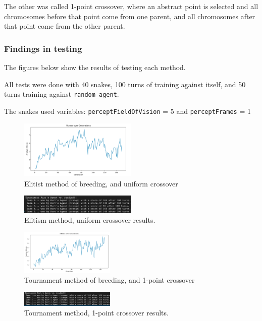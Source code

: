 \documentclass[12pt]{article}
\begin{document}
The other was called 1-point crossover, where an abstract point is selected and all chromosomes before that point come from one parent, and all chromosomes after that point come from the other parent.

\subsubsection{Findings in testing}
The figures below show the results of testing each method.

All tests were done with 40 snakes, 100 turns of training against itself, and 50 turns training against \verb|random_agent|.

The snakes used variables: \verb|perceptFieldOfVision| = 5 and \verb|perceptFrames| = 1

\begin{figure}[h]
\centering
\includegraphics[width=0.5\textwidth]{figures/fitnessGraph_pureElitism.png}
\caption{Elitist method of breeding, and uniform crossover}
\end{figure}

\begin{figure}[h]
\centering
\includegraphics[width=0.5\textwidth]{figures/PureElitismResults.png}
\caption{Elitism method, uniform crossover results.}
\end{figure}

\begin{figure}[h]
\centering
\includegraphics[width=0.4\textwidth]{figures/fitnessGraph_Tournament.png}
\caption{Tournament method of breeding, and 1-point crossover}
\end{figure}

\begin{figure}[h]
\centering
\includegraphics[width=0.4\textwidth]{figures/TournamentResults.png}
\caption{Tournament method, 1-point crossover results.}
\end{figure}
\end{document}
